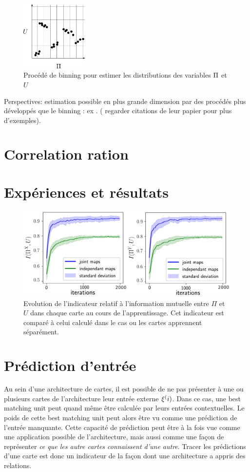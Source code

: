 \begin{figure}
\centering
\includegraphics[width=0.3\textwidth]{boxes}
\caption{Procédé de binning pour estimer les distributions des variables $\Pi$ et $U$}
\label{fig:binning} 
\end{figure}

Perspectives: estimation possible en plus grande dimension par des procédés plus développés que le binning : ex \cite{Belghazi2018MutualIN}. ( regarder citations de leur papier pour plus d'exemples). 

\section{Correlation ration}


\section{Expériences et résultats}

\begin{figure}
\centering
\includegraphics[width=\textwidth]{mutual_info_evol.pdf}
\caption{Evolution de l'indicateur relatif à l'information mutuelle entre $\Pi$ et $U$ dans chaque carte au cours de l'apprentissage. Cet indicateur est comparé à celui calculé dans le cas ou les cartes apprennent séparément.}
\label{fig:im} 
\end{figure}


\section{Prédiction d'entrée}

Au sein d'une architecture de cartes, il est possible de ne pas présenter à une ou plusieurs cartes de l'architecture leur entrée externe $\xi^({i})$. Dans ce cas, une best matching unit peut quand même être calculée par leurs entrées contextuelles. Le poids de cette best matching unit peut alors être vu comme une prédiction de l'entrée manquante. Cette capacité de prédiction peut être à la fois vue comme une application possible de l'architecture, mais aussi comme une façon de représenter \emph{ce que les autre cartes connaissent d'une autre}. Tracer les prédictions d'une carte est donc un indicateur de la façon dont une architecture a appris des relations. 